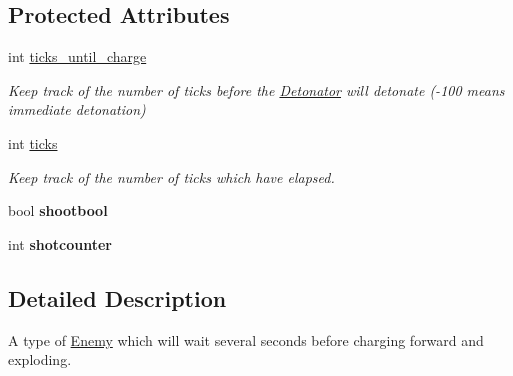 \subsection*{Protected Attributes}
\begin{DoxyCompactItemize}
\item 
\hypertarget{classDetonator_ad77bbede7489db9a9bf5e55b58149afb}{
int \hyperlink{classDetonator_ad77bbede7489db9a9bf5e55b58149afb}{ticks\_\-until\_\-charge}}
\label{classDetonator_ad77bbede7489db9a9bf5e55b58149afb}

\begin{DoxyCompactList}\small\item\em Keep track of the number of ticks before the \hyperlink{classDetonator}{Detonator} will detonate (-\/100 means immediate detonation) \end{DoxyCompactList}\item 
\hypertarget{classDetonator_af6f8846d2fd6e80c60d8855accf0c709}{
int \hyperlink{classDetonator_af6f8846d2fd6e80c60d8855accf0c709}{ticks}}
\label{classDetonator_af6f8846d2fd6e80c60d8855accf0c709}

\begin{DoxyCompactList}\small\item\em Keep track of the number of ticks which have elapsed. \end{DoxyCompactList}\item 
\hypertarget{classDetonator_af1269b22ab4a86e854ff9c8fcec99841}{
bool {\bfseries shootbool}}
\label{classDetonator_af1269b22ab4a86e854ff9c8fcec99841}

\item 
\hypertarget{classDetonator_a98487a19ef26de778a452a20af60c54e}{
int {\bfseries shotcounter}}
\label{classDetonator_a98487a19ef26de778a452a20af60c54e}

\end{DoxyCompactItemize}


\subsection{Detailed Description}
A type of \hyperlink{classEnemy}{Enemy} which will wait several seconds before charging forward and exploding. 

